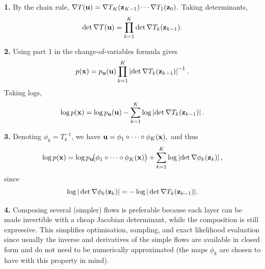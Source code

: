 \begin{solution}

\textbf{1.} By the chain rule,
\(
\nabla T({ \mathbf{u}})
=
\nabla T_K({ \mathbf{z}}_{K-1})\cdots \nabla T_1({ \mathbf{z}}_0).
\)
Taking determinants,
\[
\det \nabla T({ \mathbf{u}})
=
\prod_{k=1}^K \det \nabla T_k({ \mathbf{z}}_{k-1}).
\]

\medskip

\textbf{2.} Using part 1 in the change-of-variables formula gives
\[
p({ \mathbf{x}})
=
p_{ \mathbf{u}}({ \mathbf{u}})\prod_{k=1}^K \left|\det \nabla T_k({ \mathbf{z}}_{k-1})\right|^{-1}.
\]
Taking logs,
\[
\log p({ \mathbf{x}})
=
\log p_{ \mathbf{u}}({ \mathbf{u}})
-
\sum_{k=1}^K \log \left|\det \nabla T_k({ \mathbf{z}}_{k-1})\right|.
\]

\medskip

\textbf{3.} Denoting $\phi_k=T_k^{-1}$, we have 
\(
{ \mathbf{u}}=\phi_1\circ\cdots\circ\phi_K({ \mathbf{x}}),
\)
and thus
\[
\log p({ \mathbf{x}})
=
\log p_{ \mathbf{u}}\!\bigl(\phi_1\circ\cdots\circ\phi_K({ \mathbf{x}})\bigr)
+
\sum_{k=1}^K \log \left|\det \nabla \phi_k({ \mathbf{z}}_k)\right|,
\]
since
\[
\log |\det \nabla \phi_k({ \mathbf{z}}_k)|
=
-\log |\det \nabla T_k({ \mathbf{z}}_{k-1})|.
\]

\medskip

\textbf{4.} Composing several (simpler) flows is preferable because each layer can be made invertible with a cheap Jacobian determinant, while the composition is still expressive. This simplifies optimisation, sampling, and exact likelihood evaluation since usually the inverse and derivatives of the simple flows are available in closed form and do not need to be numerically approximated (the maps $\phi_k$ are chosen to have with this property in mind).

\end{solution}

